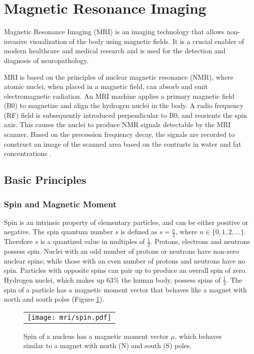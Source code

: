\section{Magnetic Resonance Imaging}
Magnetic Resonance Imaging (MRI) is an imaging technology that allows non-invasive visualization of the body using magnetic fields. It is a crucial enabler of modern healthcare and medical research and is used for the detection and diagnosis of neuropathology.

MRI is based on the principles of nuclear magnetic resonance (NMR), where atomic nuclei, when placed in a magnetic field, can absorb and emit electromagnetic radiation. An MRI machine applies a primary magnetic field (B0) to magnetize and align the hydrogen nuclei in the body. A radio frequency (RF) field is subsequently introduced perpendicular to B0, and reorients the spin axis. This causes the nuclei to produce NMR signals detectable by the MRI scanner. Based on the precession frequency decay, the signals are recorded to construct an image of the scanned area based on the contrasts in water and fat concentrations \cite{Plewes2012,Johansen-Berg2013}. 

\subsection{Basic Principles}
\subsubsection{Spin and Magnetic Moment}
Spin is an intrinsic property of elementary particles, and can be either positive or negative. The spin quantum number  $s$ is defined as $ s = \frac{n}{2}$, where $n \in \{0,1,2,...\}$. Therefore $s$ is a quantized value in multiples of $\frac{1}{2}$. Protons, electrons and neutrons possess spin. Nuclei with an odd number of protons or neutrons have non-zero nuclear spins; while those with an even number of protons and neutrons have no spin. Particles with opposite spins can pair up to produce an overall spin of zero. Hydrogen nuclei, which makes up 63$\%$ the human body, possess spins of $\frac{1}{2}$. The spin of a particle has a magnetic moment vector that behaves like a magnet with north and south poles (Figure \ref{fig:spin}).


\begin{figure}[h]
\begin{center}
\begin{tabular}{c}
\texttt{[image: mri/spin.pdf]}
\end{tabular}
\caption{Spin of a nucleus has a magnetic moment vector $\mu$, which behaves similar to a magnet with north (N) and south (S) poles.}
\label{fig:spin}
\end{center}
\end{figure}

